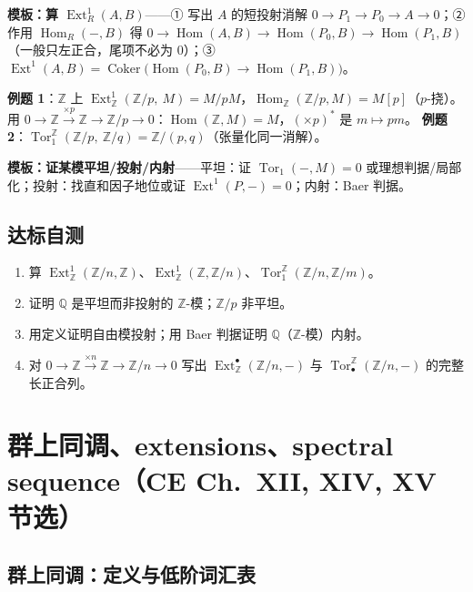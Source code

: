 \documentclass[12pt,a4paper]{ctexart}
\DeclareMathOperator{\Hom}{Hom}
\DeclareMathOperator{\Ext}{Ext}
\DeclareMathOperator{\Tor}{Tor}
\DeclareMathOperator{\Coker}{Coker}
\begin{document}
\textbf{模板：算 $\Ext^1_R(A,B)$}——① 写出 $A$ 的短投射消解 $0\to P_1\to P_0\to A\to0$；② 作用 $\Hom_R(-,B)$ 得 $0\to\Hom(A,B)\to\Hom(P_0,B)\to\Hom(P_1,B)$（一般只左正合，尾项不必为 $0$）；③ $\Ext^1(A,B)=\Coker\bigl(\Hom(P_0,B)\to\Hom(P_1,B)\bigr)$。

\textbf{例题 1}：$\mathbb Z$ 上 $\Ext^1_\mathbb Z(\mathbb Z/p,\ M)=M/pM$，$\Hom_\mathbb Z(\mathbb Z/p,M)=M[p]$（$p$-挠）。用 $0\to\mathbb Z\xrightarrow{\times p}\mathbb Z\to\mathbb Z/p\to0$：$\Hom(\mathbb Z,M)=M$，$(\times p)^*$ 是 $m\mapsto pm$。
\textbf{例题 2}：$\Tor_1^\mathbb Z(\mathbb Z/p,\ \mathbb Z/q)=\mathbb Z/(p,q)$（张量化同一消解）。

\textbf{模板：证某模平坦/投射/内射}——平坦：证 $\Tor_1(-,M)=0$ 或理想判据/局部化；投射：找直和因子地位或证 $\Ext^1(P,-)=0$；内射：Baer 判据。

\subsection{达标自测}
\begin{enumerate}[label=(\arabic*)]
  \item 算 $\Ext^1_\mathbb Z(\mathbb Z/n,\mathbb Z)$、$\Ext^1_\mathbb Z(\mathbb Z,\mathbb Z/n)$、$\Tor_1^\mathbb Z(\mathbb Z/n,\mathbb Z/m)$。
  \item 证明 $\mathbb Q$ 是平坦而非投射的 $\mathbb Z$-模；$\mathbb Z/p$ 非平坦。
  \item 用定义证明自由模投射；用 Baer 判据证明 $\mathbb Q$（$\mathbb Z$-模）内射。
  \item 对 $0\to\mathbb Z\xrightarrow{\times n}\mathbb Z\to\mathbb Z/n\to0$ 写出 $\Ext^\bullet_\mathbb Z(\mathbb Z/n,-)$ 与 $\Tor_\bullet^{\mathbb Z}(\mathbb Z/n,-)$ 的完整长正合列。
\end{enumerate}

\section{群上同调、extensions、spectral sequence（CE Ch.~XII, XIV, XV 节选）}

\subsection{群上同调：定义与低阶词汇表}
\end{document}
